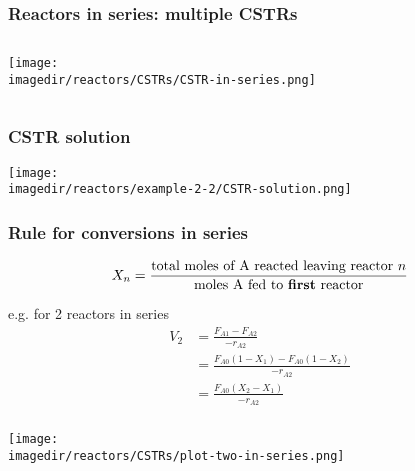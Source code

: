 
\begin{frame}\frametitle{Reactors in series: multiple CSTRs}
	\begin{columns}[t]
			\begin{center}
				\texttt{[image: \\imagedir/reactors/CSTRs/CSTR-in-series.png]}
			\end{center}
	\end{columns}
\end{frame}

\begin{frame}\frametitle{CSTR solution}
	\begin{center}
		\texttt{[image: \\imagedir/reactors/example-2-2/CSTR-solution.png]}
	\end{center}
\end{frame}

\begin{frame}\frametitle{Rule for conversions in series}
	\begin{exampleblock}{}
		$$X_n = \frac{\text{total moles of A reacted leaving reactor }n}{\text{moles A fed to \textbf{first} reactor}}$$
	\end{exampleblock}
	
	\vspace{12pt}
	e.g. for 2 reactors in series
	\begin{align*}
		V_2 &= \frac{F_{A1} - F_{A2}}{-r_{A2}}\\
			&= \frac{F_{A0}(1 - X_1) - F_{A0}(1 - X_2)}{-r_{A2}}\\
			&= \frac{F_{A0}(X_2 - X_1)}{-r_{A2}}
	\end{align*}
\end{frame}

\begin{frame}\frametitle{}
	\begin{center}
		\texttt{[image: \\imagedir/reactors/CSTRs/plot-two-in-series.png]}
	\end{center}
\end{frame}


